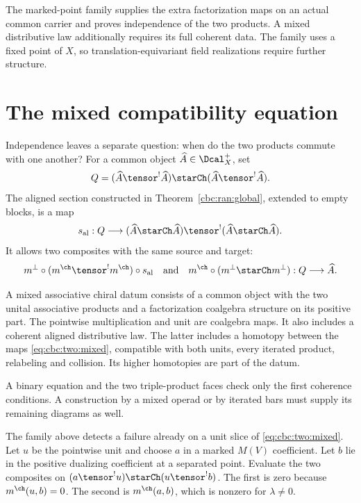 The marked-point family supplies the extra factorization maps on an actual common carrier and proves independence of the two products.
A mixed distributive law additionally requires its full coherent data.
The family uses a fixed point of $X$, so translation-equivariant field realizations require further structure.

\section{The mixed compatibility equation}
Independence leaves a separate question: when do the two products
commute with one another?
For a common object $\widehat A\in\Dcal_X^+$, set
\[
 Q=(\widehat A\tensor^!\widehat A)\starCh
                  (\widehat A\tensor^!\widehat A).
\]
The aligned section constructed in Theorem~\ref{cbc:ran:global},
extended to empty blocks, is a map
\[
 s_{\mathrm{al}}:Q\longrightarrow
 (\widehat A\starCh\widehat A)\tensor^!
 (\widehat A\starCh\widehat A).
\]
It allows two composites with the same source and target:
\begin{equation}
 m^\perp\circ(m^{\ch}\tensor^!m^{\ch})\circ s_{\mathrm{al}}
 \quad\text{and}\quad
 m^{\ch}\circ(m^\perp\starCh m^\perp):Q\longrightarrow\widehat A.
 \label{eq:cbc:two:mixed}
\end{equation}

\begin{definition}
\label{cbc:two:mixed}
A mixed associative chiral datum consists of a common object with
the two unital associative products and a factorization coalgebra
structure on its positive part.
The pointwise multiplication and unit are coalgebra maps.
It also includes a coherent aligned distributive law.
The latter includes a homotopy between the maps
\eqref{eq:cbc:two:mixed}, compatible with both units, every iterated
product, relabeling and collision. Its higher homotopies are part
of the datum.
\end{definition}

A binary equation and the two triple-product faces check only the
first coherence conditions. A construction by a mixed operad or by
iterated bars must supply its remaining diagrams as well.

The family above detects a failure already on a unit slice of
\eqref{eq:cbc:two:mixed}.
Let $u$ be the pointwise unit and choose $a$ in a marked $M(V)$ coefficient.
Let $b$ lie in the positive dualizing coefficient at a separated point.
Evaluate the two composites on
$(a\tensor^!u)\starCh(u\tensor^!b)$.
The first is zero because $m^{\ch}(u,b)=0$.
The second is $m^{\ch}(a,b)$, which is nonzero for $\lambda\ne0$.

